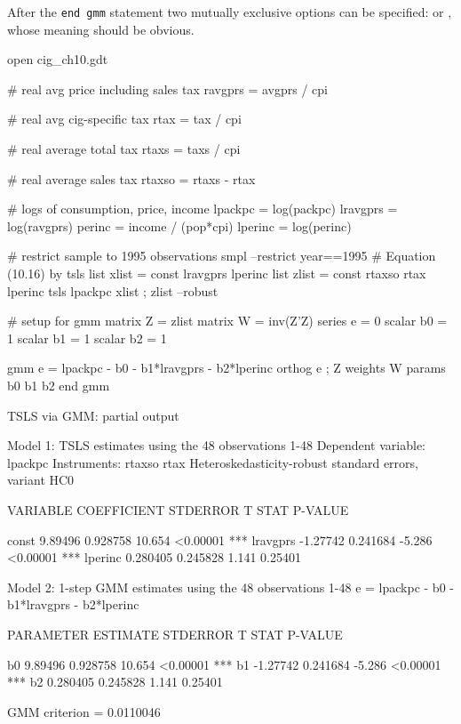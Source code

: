 After the \texttt{end gmm} statement two mutually
exclusive options can be specified:  or
, whose meaning should be obvious.

\begin{script}[htbp]
\begin{scode}
open cig_ch10.gdt

# real avg price including sales tax
ravgprs = avgprs / cpi

# real avg cig-specific tax
rtax = tax / cpi

# real average total tax
rtaxs = taxs / cpi

# real average sales tax
rtaxso = rtaxs - rtax

# logs of consumption, price, income
lpackpc = log(packpc)
lravgprs = log(ravgprs)
perinc = income / (pop*cpi)
lperinc = log(perinc)

# restrict sample to 1995 observations
smpl --restrict year==1995
# Equation (10.16) by tsls
list xlist = const lravgprs lperinc
list zlist = const rtaxso rtax lperinc
tsls lpackpc xlist ; zlist --robust

# setup for gmm
matrix Z = { zlist }
matrix W = inv(Z'Z)
series e = 0
scalar b0 = 1
scalar b1 = 1
scalar b2 = 1

gmm e = lpackpc - b0 - b1*lravgprs - b2*lperinc
  orthog e ; Z
  weights W
  params b0 b1 b2
end gmm 
\end{scode}
\end{script}

\begin{script}[htbp]
  \caption{TSLS via GMM: partial output}
  \label{gmm-tsls-out}
\begin{outbit}
Model 1: TSLS estimates using the 48 observations 1-48
Dependent variable: lpackpc
Instruments: rtaxso rtax 
Heteroskedasticity-robust standard errors, variant HC0

      VARIABLE       COEFFICIENT        STDERROR      T STAT   P-VALUE

  const                 9.89496          0.928758     10.654  <0.00001 ***
  lravgprs             -1.27742          0.241684     -5.286  <0.00001 ***
  lperinc               0.280405         0.245828      1.141   0.25401

Model 2: 1-step GMM estimates using the 48 observations 1-48
e = lpackpc - b0 - b1*lravgprs - b2*lperinc

      PARAMETER       ESTIMATE          STDERROR      T STAT   P-VALUE

  b0                    9.89496          0.928758     10.654  <0.00001 ***
  b1                   -1.27742          0.241684     -5.286  <0.00001 ***
  b2                    0.280405         0.245828      1.141   0.25401

  GMM criterion = 0.0110046
\end{outbit}
\end{script}


